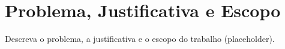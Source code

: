 \section{Problema, Justificativa e Escopo}
Descreva o problema, a justificativa e o escopo do trabalho (placeholder).

